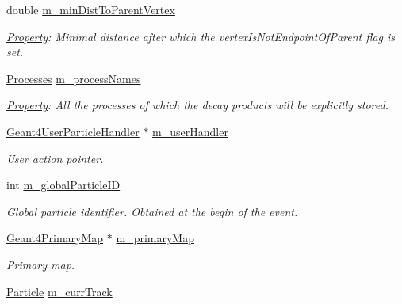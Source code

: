 \begin{DoxyCompactItemize}
double \hyperlink{class_d_d4hep_1_1_simulation_1_1_geant4_particle_handler_ac60a7876123ba7481d080a4ef284a730}{m\+\_\+min\+Dist\+To\+Parent\+Vertex}
\begin{DoxyCompactList}\small\item\em \hyperlink{class_d_d4hep_1_1_property}{Property}\+: Minimal distance after which the vertex\+Is\+Not\+Endpoint\+Of\+Parent flag is set. \end{DoxyCompactList}\item 
\hyperlink{class_d_d4hep_1_1_simulation_1_1_geant4_particle_handler_a80c1482fd25ec687f429854033ac3f79}{Processes} \hyperlink{class_d_d4hep_1_1_simulation_1_1_geant4_particle_handler_a86ffc05d00b981f7225c2cc6565e7739}{m\+\_\+process\+Names}
\begin{DoxyCompactList}\small\item\em \hyperlink{class_d_d4hep_1_1_property}{Property}\+: All the processes of which the decay products will be explicitly stored. \end{DoxyCompactList}\item 
\hyperlink{class_d_d4hep_1_1_simulation_1_1_geant4_user_particle_handler}{Geant4\+User\+Particle\+Handler} $\ast$ \hyperlink{class_d_d4hep_1_1_simulation_1_1_geant4_particle_handler_a6614f131fd012f3e1aa7f13576baf256}{m\+\_\+user\+Handler}
\begin{DoxyCompactList}\small\item\em User action pointer. \end{DoxyCompactList}\item 
int \hyperlink{class_d_d4hep_1_1_simulation_1_1_geant4_particle_handler_a71f6aba6c3188b49fd16b63a3fff78a7}{m\+\_\+global\+Particle\+ID}
\begin{DoxyCompactList}\small\item\em Global particle identifier. Obtained at the begin of the event. \end{DoxyCompactList}\item 
\hyperlink{class_d_d4hep_1_1_simulation_1_1_geant4_primary_map}{Geant4\+Primary\+Map} $\ast$ \hyperlink{class_d_d4hep_1_1_simulation_1_1_geant4_particle_handler_a7b305cc199ec643d3014483dcc8a93b2}{m\+\_\+primary\+Map}
\begin{DoxyCompactList}\small\item\em Primary map. \end{DoxyCompactList}\item 
\hyperlink{class_d_d4hep_1_1_simulation_1_1_geant4_particle_handler_a69214f487c50f6fd550571f37e715117}{Particle} \hyperlink{class_d_d4hep_1_1_simulation_1_1_geant4_particle_handler_a4b3c0241a36842b2a6048a3e572e9c48}{m\+\_\+curr\+Track}

\end{DoxyCompactItemize}
